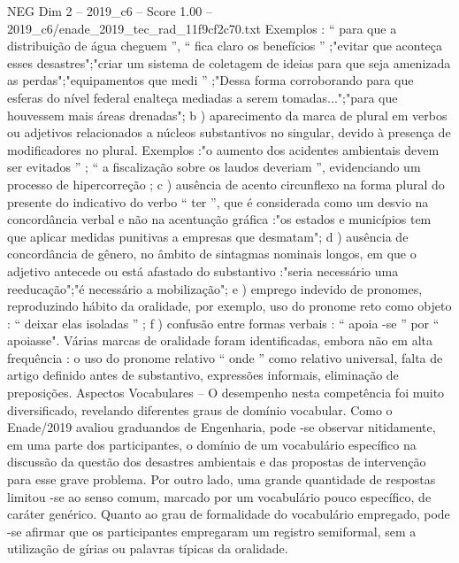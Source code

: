 \begin{textsample}{NEG Dim 2 – 2019\_c6 – Score 1.00 – 2019\_c6/enade\_2019\_tec\_rad\_11f9cf2c70.txt}
Exemplos : “ para que a distribuição de água cheguem ”, “ fica claro os benefícios ” ;"evitar que aconteça esses desastres";"criar um sistema de coletagem de ideias para que seja amenizada as perdas";"equipamentos que medi ” ;"Dessa forma corroborando para que esferas do nível federal enalteça mediadas a serem tomadas...";"para que houvessem mais áreas drenadas"; b ) aparecimento da marca de plural em verbos ou adjetivos relacionados a núcleos substantivos no singular, devido à presença de modificadores no plural.
Exemplos :"o aumento dos acidentes ambientais devem ser evitados ” ; “ a fiscalização sobre os laudos deveriam ”, evidenciando um processo de hipercorreção ; c ) ausência de acento circunflexo na forma plural do presente do indicativo do verbo “ ter ”, que é considerada como um desvio na concordância verbal e não na acentuação gráfica :"os estados e municípios tem que aplicar medidas punitivas a empresas que desmatam"; d ) ausência de concordância de gênero, no âmbito de sintagmas nominais longos, em que o adjetivo antecede ou está afastado do substantivo :"seria necessário uma reeducação";"é necessário a mobilização"; e ) emprego indevido de pronomes, reproduzindo hábito da oralidade, por exemplo, uso do pronome reto como objeto : “ deixar elas isoladas ” ; f ) confusão entre formas verbais : “ apoia -se ” por “ apoiasse".
Várias marcas de oralidade foram identificadas, embora não em alta frequência : o uso do pronome relativo “ onde ” como relativo universal, falta de artigo definido antes de substantivo, expressões informais, eliminação de preposições.
Aspectos Vocabulares – O desempenho nesta competência foi muito diversificado, revelando diferentes graus de domínio vocabular.
Como o Enade/2019 avaliou graduandos de Engenharia, pode -se observar nitidamente, em uma parte dos participantes, o domínio de um vocabulário específico na discussão da questão dos desastres ambientais e das propostas de intervenção para esse grave problema.
Por outro lado, uma grande quantidade de respostas limitou -se ao senso comum, marcado por um vocabulário pouco específico, de caráter genérico.
Quanto ao grau de formalidade do vocabulário empregado, pode -se afirmar que os participantes empregaram um registro semiformal, sem a utilização de gírias ou palavras típicas da oralidade.

\end{textsample}
